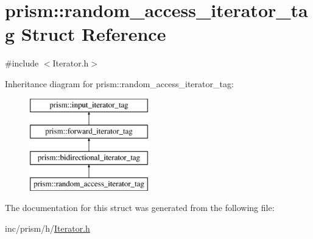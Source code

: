 \hypertarget{structprism_1_1random__access__iterator__tag}{}\section{prism\+:\+:random\+\_\+access\+\_\+iterator\+\_\+tag Struct Reference}
\label{structprism_1_1random__access__iterator__tag}


{\ttfamily \#include $<$Iterator.\+h$>$}

Inheritance diagram for prism\+:\+:random\+\_\+access\+\_\+iterator\+\_\+tag\+:\begin{figure}[H]
\begin{center}
\leavevmode
\includegraphics[height=4.000000cm]{structprism_1_1random__access__iterator__tag}
\end{center}
\end{figure}


The documentation for this struct was generated from the following file\+:\begin{DoxyCompactItemize}
\item 
inc/prism/h/\hyperlink{_iterator_8h}{Iterator.\+h}\end{DoxyCompactItemize}
